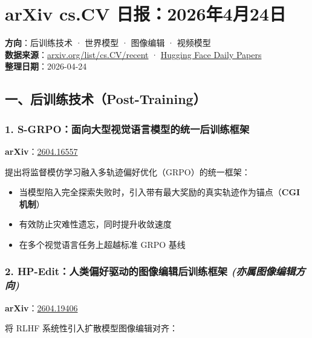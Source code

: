 
\section{arXiv cs.CV 日报：2026年4月24日}

\begin{conceptbox}
\textbf{方向}：后训练技术 · 世界模型 · 图像编辑 · 视频模型\\
\textbf{数据来源}：\href{https://arxiv.org/list/cs.CV/recent}{arxiv.org/list/cs.CV/recent} · \href{https://huggingface.co/papers}{Hugging Face Daily Papers}\\
\textbf{整理日期}：2026-04-24
\end{conceptbox}

\subsection{一、后训练技术（Post-Training）}

\subsubsection{1. S-GRPO：面向大型视觉语言模型的统一后训练框架}

\textbf{arXiv}：\href{https://arxiv.org/abs/2604.16557}{2604.16557}

提出将监督模仿学习融入多轨迹偏好优化（GRPO）的统一框架：

\begin{itemize}[leftmargin=1.5em]
  \item 当模型陷入完全探索失败时，引入带有最大奖励的真实轨迹作为锚点（\textbf{CGI 机制}）
  \item 有效防止灾难性遗忘，同时提升收敛速度
  \item 在多个视觉语言任务上超越标准 GRPO 基线
\end{itemize}

\subsubsection{2. HP-Edit：人类偏好驱动的图像编辑后训练框架 \textit{(亦属图像编辑方向)}}

\textbf{arXiv}：\href{https://arxiv.org/abs/2604.19406}{2604.19406}

将 RLHF 系统性引入扩散模型图像编辑对齐：

